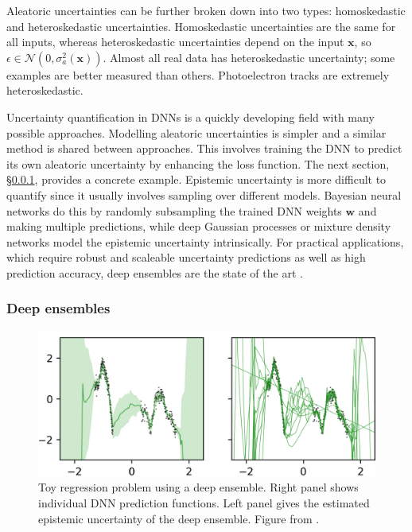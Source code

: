 Aleatoric uncertainties can be further broken down into two types: homoskedastic and heteroskedastic uncertainties. Homoskedastic uncertainties are the same for all inputs, whereas heteroskedastic uncertainties depend on the input $\mathbf{x}$, so $\epsilon \in \mathcal{N}(0,\sigma^2_a(\mathbf{x}))$. Almost all real data has heteroskedastic uncertainty; some examples are better measured than others. Photoelectron tracks are extremely heteroskedastic. 

Uncertainty quantification in DNNs is a quickly developing field with many possible approaches. Modelling aleatoric uncertainties is simpler and a similar method is shared between approaches. This involves training the DNN to predict its own aleatoric uncertainty by enhancing the loss function. The next section, \S\ref{sec:deepens}, provides a concrete example. Epistemic uncertainty is more difficult to quantify since it usually involves sampling over different models. Bayesian neural networks \citep{kendall_what_2017} do this by randomly subsampling the trained DNN weights $\mathbf{w}$ and making multiple predictions, while deep Gaussian processes \citep{jakkala_deep_2021} or mixture density networks \citep{choi_uncertainty-aware_2017} model the epistemic uncertainty intrinsically. For practical applications, which require robust and scaleable uncertainty predictions as well as high prediction accuracy, deep ensembles \citep{lakshminarayanan_simple_2017} are the state of the art \citep{gustafsson_evaluating_2020}.

\subsubsection{Deep ensembles}
\label{sec:deepens}

\begin{figure}[t]
\centering
\includegraphics[scale=.35]{figures/antoran.png}
\caption{Toy regression problem using a deep ensemble. Right panel shows individual DNN prediction functions. Left panel gives the estimated epistemic uncertainty of the deep ensemble. Figure from \citet{antoran_depth_2020}.}
\label{fig:epinet}       %
\end{figure}

